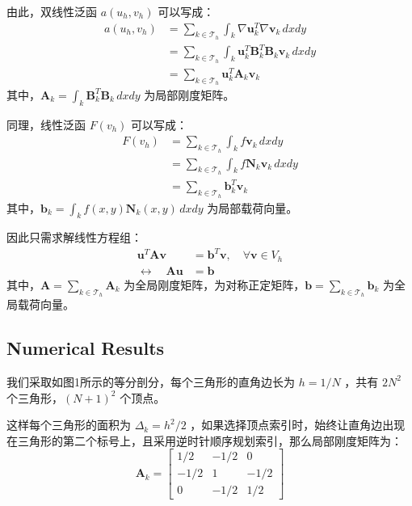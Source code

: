 \documentclass[11pt]{ctexart}
\begin{document}
由此，双线性泛函 $ a(u_h,v_h) $ 可以写成：
\begin{equation}
  \begin{aligned}
    a(u_h,v_h) &= \sum_{k\in \mathcal{T}_h} \int_{k} \nabla \mathbf{u}_k^T \nabla \mathbf{v}_k \, dx dy\\
    &= \sum_{k\in \mathcal{T}_h} \int_{k} \mathbf{u}_k^T \mathbf{B}_k^T \mathbf{B}_k \mathbf{v}_k \, dx dy\\
    &= \sum_{k\in \mathcal{T}_h} \mathbf{u}_k^T \mathbf{A}_k \mathbf{v}_k
  \end{aligned}
\end{equation}
其中，$ \mathbf{A}_k = \int_{k} \mathbf{B}_k^T \mathbf{B}_k \, dx dy $ 为局部刚度矩阵。

同理，线性泛函 $ F(v_h) $ 可以写成：
\begin{equation}
  \begin{aligned}
    F(v_h) &= \sum_{k\in \mathcal{T}_h} \int_{k} f \mathbf{v}_k \, dx dy\\
    &= \sum_{k\in \mathcal{T}_h} \int_{k} f \mathbf{N}_k \mathbf{v}_k \, dx dy\\
    &= \sum_{k\in \mathcal{T}_h} \mathbf{b}_k^T \mathbf{v}_k
  \end{aligned}
\end{equation}
其中，$ \mathbf{b}_k = \int_{k} f(x,y) \mathbf{N}_k(x,y) \, dx dy $ 为局部载荷向量。

因此只需求解线性方程组：
\begin{equation}
  \begin{aligned}
    \mathbf{u}^T \mathbf{A} \mathbf{v} &= \mathbf{b}^T \mathbf{v}, \quad \forall \mathbf{v} \in V_h\\
    \leftrightarrow \quad \mathbf{A} \mathbf{u} &= \mathbf{b}
  \end{aligned}
\end{equation}
其中，$ \mathbf{A} = \sum_{k\in \mathcal{T}_h} \mathbf{A}_k $ 为全局刚度矩阵，为对称正定矩阵，$ \mathbf{b} = \sum_{k\in \mathcal{T}_h} \mathbf{b}_k $ 为全局载荷向量。

\subsection{Numerical Results}
我们采取如图1所示的等分剖分，每个三角形的直角边长为 $ h=1/N$ ，共有 $ 2N^2 $ 个三角形，$ (N+1)^2 $ 个顶点。

这样每个三角形的面积为 $ \Delta_k = h^2/2 $ ，如果选择顶点索引时，始终让直角边出现在三角形的第二个标号上，且采用逆时针顺序规划索引，那么局部刚度矩阵为：
\begin{equation}
  \mathbf{A}_k = \begin{bmatrix}
    1/2 & -1/2 & 0\\
    -1/2 & 1 & -1/2\\
    0 & -1/2 & 1/2
  \end{bmatrix}
\end{equation}
\end{document}
